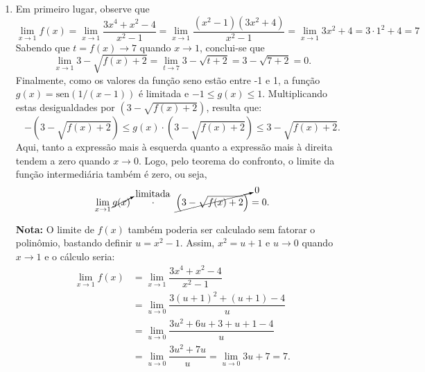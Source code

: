 \documentclass[12pt,a4paper]{article}
\begin{document}
\begin{enumerate}
\begin{enumerate}
\item Em primeiro lugar, observe que
\[
  \lim\limits_{x\to 1}f(x)
= \lim\limits_{x\to 1} \dfrac{3x^4+x^2-4}{x^2-1}
= \lim\limits_{x\to 1} \dfrac{(x^2-1)(3x^2+4)}{x^2-1}
= \lim\limits_{x\to 1} 3x^2 + 4
= 3 \cdot 1^2 + 4
= 7
\]
Sabendo que $t = f(x) \to 7$ quando $x \to 1$, conclui-se que
\[
  \lim\limits_{x \to 1} 3 - \sqrt{f(x) + 2}
= \lim\limits_{t \to 7} 3 - \sqrt{t + 2}
= 3 - \sqrt{7 + 2}
= 0.
\]
Finalmente, como os valores da função seno estão entre -1 e 1, a função $g(x) = \text{sen}( 1/(x - 1) )$ é limitada e $-1 \leq g(x) \leq 1$. Multiplicando estas desigualdades por $\left(3 - \sqrt{f(x) + 2}\right)$, resulta que:
\[
    -\left(3 - \sqrt{f(x) + 2}\right)
\leq g(x) \cdot \left(3-\sqrt{f(x)+2}\right)
\leq 3 - \sqrt{f(x)+2}.
\]
Aqui, tanto a expressão mais à esquerda quanto a expressão mais à direita tendem a zero quando $x \to 0$. Logo, pelo teorema do confronto, o limite da função intermediária também é zero, ou seja,
\[
\lim\limits_{x\to 1}
    \cancelto{\text{limitada}}{g(x)}
    \qquad \cdot \qquad
    \cancelto{0}{\left(3 - \sqrt{f(x) + 2} \right)} = 0.
\]

\textbf{Nota:} O limite de $f(x)$ também poderia ser calculado sem fatorar o polinômio, bastando definir $u = x^2 - 1$. Assim, $x^2 = u+1$ e $u \to 0$ quando $x \to 1$ e o cálculo seria:
\begin{align*}
  \lim\limits_{x\to 1} f(x)
& = \lim\limits_{x\to 1} \dfrac{3x^4+x^2-4}{x^2-1} \\
& = \lim\limits_{u\to 0} \dfrac{3(u+1)^2+(u+1)-4}{u} \\
& = \lim\limits_{u\to 0} \dfrac{3u^2 + 6u + 3 + u + 1 - 4}{u} \\
& = \lim\limits_{u\to 0} \dfrac{3u^2 + 7u}{u}
  = \lim\limits_{u\to 0} 3u + 7
  = 7.
\end{align*}
\end{enumerate}


\end{enumerate}
\end{document}
